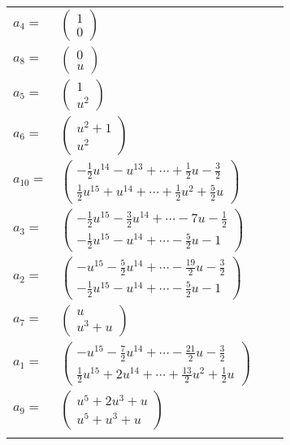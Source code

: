 \documentclass[1p]{elsarticle_modified}
\theoremstyle{definition}
\begin{document}
\begin{tabular}{m{7pt} m{180pt} m{7pt} m{180pt} }
\flushright $a_{4}=$&$\begin{pmatrix}1\\0\end{pmatrix}$ \\
\flushright $a_{8}=$&$\begin{pmatrix}0\\u\end{pmatrix}$ \\
\flushright $a_{5}=$&$\begin{pmatrix}1\\u^2\end{pmatrix}$ \\
\flushright $a_{6}=$&$\begin{pmatrix}u^2+1\\u^2\end{pmatrix}$ \\
\flushright $a_{10}=$&$\begin{pmatrix}-\frac{1}{2} u^{14}- u^{13}+\cdots+\frac{1}{2} u-\frac{3}{2}\\\frac{1}{2} u^{15}+u^{14}+\cdots+\frac{1}{2} u^2+\frac{5}{2} u\end{pmatrix}$ \\
\flushright $a_{3}=$&$\begin{pmatrix}-\frac{1}{2} u^{15}-\frac{3}{2} u^{14}+\cdots-7 u-\frac{1}{2}\\-\frac{1}{2} u^{15}- u^{14}+\cdots-\frac{5}{2} u-1\end{pmatrix}$ \\
\flushright $a_{2}=$&$\begin{pmatrix}- u^{15}-\frac{5}{2} u^{14}+\cdots-\frac{19}{2} u-\frac{3}{2}\\-\frac{1}{2} u^{15}- u^{14}+\cdots-\frac{5}{2} u-1\end{pmatrix}$ \\
\flushright $a_{7}=$&$\begin{pmatrix}u\\u^3+u\end{pmatrix}$ \\
\flushright $a_{1}=$&$\begin{pmatrix}- u^{15}-\frac{7}{2} u^{14}+\cdots-\frac{21}{2} u-\frac{3}{2}\\\frac{1}{2} u^{15}+2 u^{14}+\cdots+\frac{13}{2} u^2+\frac{1}{2} u\end{pmatrix}$ \\
\flushright $a_{9}=$&$\begin{pmatrix}u^5+2 u^3+u\\u^5+u^3+u\end{pmatrix}$\\&\end{tabular}
\end{document}
